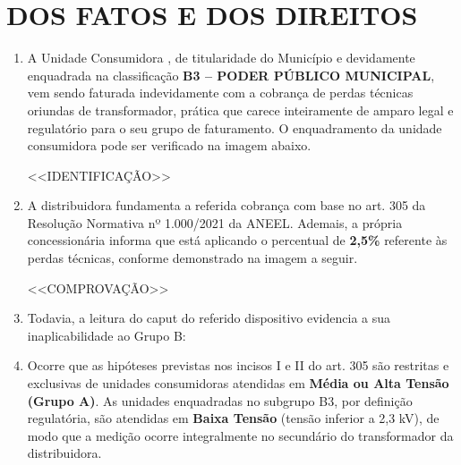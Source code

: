 \newcommand{\tipoRequerimento}{Perda por transformação}

\section{DOS FATOS E DOS DIREITOS}

\begin{enumerate}[resume]

\item A Unidade Consumidora \unidadeConsumidora{}, de titularidade do Município e devidamente enquadrada na classificação \textbf{B3 -- PODER PÚBLICO MUNICIPAL}, vem sendo faturada indevidamente com a cobrança de perdas técnicas oriundas de transformador, prática que carece inteiramente de amparo legal e regulatório para o seu grupo de faturamento. O enquadramento da unidade consumidora pode ser verificado na imagem abaixo.

<<IDENTIFICAÇÃO>>

\item A distribuidora fundamenta a referida cobrança com base no art. 305 da Resolução Normativa nº 1.000/2021 da ANEEL. Ademais, a própria concessionária informa que está aplicando o percentual de \textbf{2,5\%} referente às perdas técnicas, conforme demonstrado na imagem a seguir.

<<COMPROVAÇÃO>>

\item Todavia, a leitura do caput do referido dispositivo evidencia a sua inaplicabilidade ao Grupo B:


\item Ocorre que as hipóteses previstas nos incisos I e II do art. 305 são restritas e exclusivas de unidades consumidoras atendidas em \textbf{Média ou Alta Tensão (Grupo A)}. As unidades enquadradas no subgrupo B3, por definição regulatória, são atendidas em \textbf{Baixa Tensão} (tensão inferior a 2,3 kV), de modo que a medição ocorre integralmente no secundário do transformador da distribuidora.


\end{enumerate}
